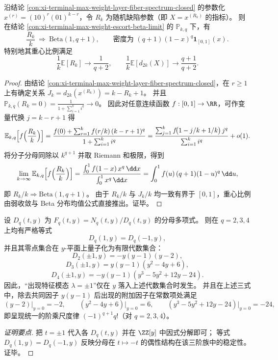\begin{conclusion}\label{con:xi-terminal-max-weight-defect-localization}
沿结论 \ref{con:xi-terminal-max-weight-layer-fiber-spectrum-closed} 的参数化 \(x^{(r)}=(10)^r(01)^{k-r}\)，令 \(R_k\) 为随机缺陷参数（即 \(X=x^{(R_k)}\) 的指标）。
则在结论 \ref{con:xi-terminal-max-weight-escort-beta-limit} 的 \(\mathbb{P}_{k,q}\) 下，有
\[
\frac{R_k}{k}\ \Rightarrow\ \mathrm{Beta}(1,q+1),
\qquad \text{密度为 }(q+1)(1-x)^q\mathbf 1_{[0,1]}(x).
\]
特别地其重心比例满足
\[
\frac{1}{k}\mathbb{E}[R_k]\to \frac{1}{q+2},
\qquad
\frac{1}{k}\mathbb{E}[d_{2k}(X)]\to \frac{q+1}{q+2}.
\]
\end{conclusion}
\begin{proof}
由结论 \ref{con:xi-terminal-max-weight-layer-fiber-spectrum-closed}，在 \(r\ge 1\) 上有确定关系
\(
J_k=d_{2k}(x^{(R_k)})=k-R_k+1
\)。
并且
\(
\mathbb{P}_{k,q}(R_k=0)=\frac{1}{1+\sum_{i=1}^{k}i^q}\to 0
\)。
因此对任意连续函数 \(f:[0,1]\to\RR\)，可作变量代换 \(j=k-r+1\) 得
\[
\mathbb{E}_{k,q}\Bigl[f\Bigl(\frac{R_k}{k}\Bigr)\Bigr]
=\frac{f(0)+\sum_{r=1}^{k} f(r/k)\,(k-r+1)^q}{1+\sum_{i=1}^{k}i^q}
=\frac{\sum_{j=1}^{k} f\!\bigl(1-j/k+1/k\bigr)\,j^q}{\sum_{i=1}^{k}i^q}+o(1).
\]
将分子分母同除以 \(k^{q+1}\) 并取 Riemann 和极限，得到
\[
\lim_{k\to\infty}\mathbb{E}_{k,q}\Bigl[f\Bigl(\frac{R_k}{k}\Bigr)\Bigr]
=\frac{\int_{0}^{1} f(1-x)\,x^q\,\dd x}{\int_{0}^{1}x^q\,\dd x}
=\int_{0}^{1} f(u)\,(q+1)(1-u)^q\,\dd u,
\]
即 \(R_k/k\Rightarrow \mathrm{Beta}(1,q+1)\)。
由于 \(R_k/k\) 与 \(J_k/k\) 均一致有界于 \([0,1]\)，重心比例由弱收敛与 Beta 分布均值公式直接推出。证毕。
\end{proof}

\begin{conclusion}[\texorpdfstring{$t=\pm1$}{t=±1} 直线的零轨迹：重量参数的代数曲线量子化]\label{con:xi-terminal-zq-line-tpm1-zeros}
设 \(D_q(t,y)\) 为 \(F_q(t,y)=N_q(t,y)/D_q(t,y)\) 的分母多项式。
则在 \(q=2,3,4\) 上均有严格等式
\[
D_q(1,y)=D_q(-1,y),
\]
并且其零点集合在 \(y\)-平面上量子化为有限代数集合：
\[
D_2(\pm1,y)=-y(y-1)(y-2),
\]
\[
D_3(\pm1,y)=y(y-1)(y^2-4y+6),
\]
\[
D_4(\pm1,y)=-y(y-1)(y^3-5y^2+12y-24).
\]
因此，“出现特征模态 \(\lambda=\pm1\)”仅在 \(y\) 落入上述代数集合时发生。
并且在上述三式中，除去共同因子 \(y(y-1)\) 后出现的附加因子在常数项处满足
\[
(y-2)\big|_{y=0}=-2,\qquad
(y^2-4y+6)\big|_{y=0}=6,\qquad
(y^3-5y^2+12y-24)\big|_{y=0}=-24,
\]
即呈现统一的阶乘尺度律 \(({-}1)^{q+1}q!\)（对 \(q=2,3,4\)）。
\end{conclusion}
\begin{proof}[证明要点]
把 \(t=\pm1\) 代入各 \(D_q(t,y)\) 并在 \(\ZZ[y]\) 中因式分解即可；
等式 \(D_q(1,y)=D_q(-1,y)\) 反映分母在 \(t\mapsto -t\) 的偶性结构在该三阶族中的稳定性。证毕。
\end{proof}

